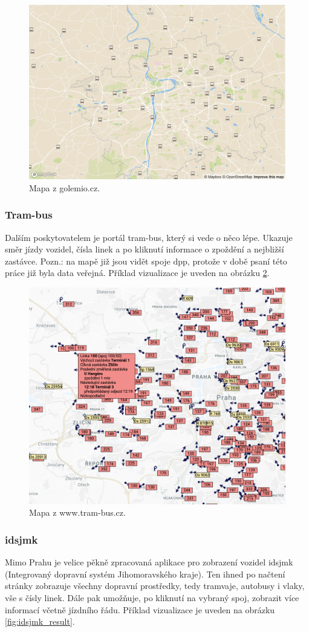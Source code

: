 \begin{figure}
	\centering
  \includegraphics[width=0.5\linewidth]{../img/golemio_mapa.png}
  \caption{Mapa z golemio.cz.}
  \label{fig:golemio_result}
\end{figure}

\subsubsection{Tram-bus}

Dalším poskytovatelem je portál tram-bus, který si vede o něco lépe. Ukazuje směr jízdy vozidel, čísla linek a po kliknutí informace o zpoždění a nejbližší zastávce. Pozn.: na mapě již jsou vidět spoje \gls{dpp}, protože v době psaní této práce již byla data veřejná. Příklad vizualizace je uveden na obrázku \ref{fig:tram-bus_result}.

\begin{figure}
	\centering
  \includegraphics[width=0.5\linewidth]{../img/tram-bus_mapa.png}
  \caption{Mapa z www.tram-bus.cz.}
  \label{fig:tram-bus_result}
\end{figure}

\subsubsection{\gls{idsjmk}}

Mimo Prahu je velice pěkně zpracovaná aplikace pro zobrazení vozidel \gls{idsjmk} (Integrovaný dopravní systém Jihomoravského kraje). Ten ihned po načtení stránky zobrazuje všechny dopravní prostředky, tedy tramvaje, autobusy i vlaky, vše s čísly linek. Dále pak umožňuje, po kliknutí na vybraný spoj, zobrazit více informací včetně jízdního řádu. Příklad vizualizace je uveden na obrázku \ref{fig:idsjmk_result}.

